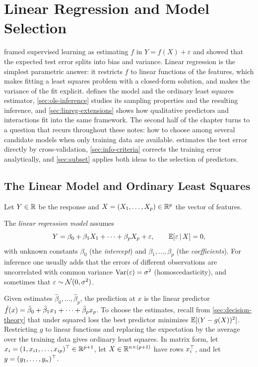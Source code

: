 \chapter{Linear Regression and Model Selection}\label{ch:linreg}

 framed supervised learning as estimating $f$ in $Y=f(X)+\varepsilon$ and showed that the expected test error splits into bias and variance. Linear regression is the simplest parametric answer: it restricts $f$ to linear functions of the features, which makes fitting a least squares problem with a closed-form solution, and makes the variance of the fit explicit.  defines the model and the ordinary least squares estimator, \cref{sec:ols-inference} studies its sampling properties and the resulting inference, and \cref{sec:linreg-extensions} shows how qualitative predictors and interactions fit into the same framework. The second half of the chapter turns to a question that recurs throughout these notes: how to choose among several candidate models when only training data are available.  estimates the test error directly by cross-validation, \cref{sec:info-criteria} corrects the training error analytically, and \cref{sec:subset} applies both ideas to the selection of predictors.

\section{The Linear Model and Ordinary Least Squares}\label{sec:ols}

Let $Y\in\mathbb{R}$ be the response and $X=(X_1,\dots,X_p)\in\mathbb{R}^p$ the vector of features.

\begin{definition}\label{def:linear-model}
The \emph{linear regression model} assumes
\[
Y=\beta_0+\beta_1X_1+\dots+\beta_pX_p+\varepsilon,\qquad \mathbb{E}[\varepsilon\,|\, X]=0,
\]
with unknown constants $\beta_0$ (the \emph{intercept}) and $\beta_1,\dots,\beta_p$ (the \emph{coefficients}). For inference one usually adds that the errors of different observations are uncorrelated with common variance $\operatorname{Var}(\varepsilon)=\sigma^2$ (homoscedasticity), and sometimes that $\varepsilon\sim\mathcal{N}(0,\sigma^2)$.
\end{definition}

Given estimates $\hat\beta_0,\dots,\hat\beta_p$, the prediction at $x$ is the linear predictor $\hat f(x)=\hat\beta_0+\hat\beta_1x_1+\dots+\hat\beta_px_p$. To choose the estimates, recall from \cref{sec:decision-theory} that under squared loss the best predictor minimizes $\mathbb{E}[(Y-g(X))^2]$. Restricting $g$ to linear functions and replacing the expectation by the average over the training data gives ordinary least squares. In matrix form, let $x_i=(1,x_{i1},\dots,x_{ip})^{\top}\in\mathbb{R}^{p+1}$, let $X\in\mathbb{R}^{n\times(p+1)}$ have rows $x_i^{\top}$, and let $y=(y_1,\dots,y_n)^{\top}$.

